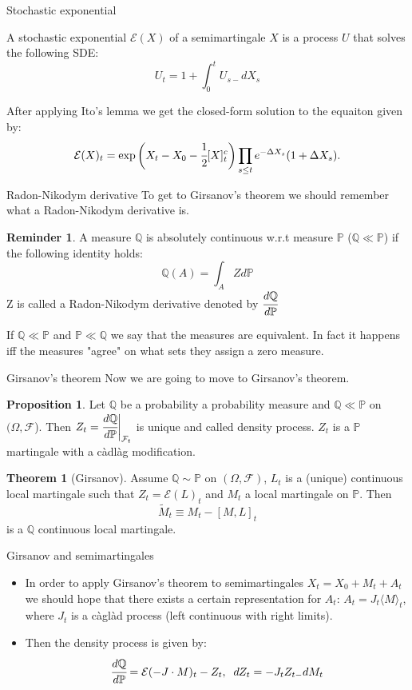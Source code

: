 \documentclass{beamer}%
\theoremstyle{definition}
\newtheorem{mytheor}[theorem]{Theorem}
\newtheorem{reminder}{Reminder}
\newtheorem{proposition}[theorem]{Proposition}
\renewcommand{\P}{\mathbb{P}}
\newcommand{\Q}{\mathbb{Q}}
\begin{document}
\begin{frame}{Stochastic exponential}
\begin{definition}
    A stochastic exponential $\mathcal{E}(X)$  of a semimartingale $X$ is a process $U$ that solves the following SDE:
    $$
    U_t = 1 + \int_0^t U_{s-} dX_s 
    $$
\end{definition}
After applying Ito's lemma we get the closed-form solution to the equaiton given by:
$$
\mathcal{E}(X)_t = 
\exp{\bigg(X_t - X_0 - \cfrac{1}{2} [X]_t^c\bigg)}\prod_{s \leq t} e^{-\Delta X_s}(1 + \Delta X_s).
$$
\end{frame}


\begin{frame}{Radon-Nikodym derivative}
To get to Girsanov's theorem we should remember what a Radon-Nikodym derivative is.
\begin{reminder}
A measure $\mathbb{Q}$ is absolutely continuous w.r.t measure $\P$ ($\mathbb{Q} \ll \P$) if the following identity holds:
$$
\mathbb{Q}(A) = \int_A Z d\mathbb{P}
$$
Z is called a Radon-Nikodym derivative denoted by $\cfrac{d\mathbb{Q}}{d\P}$
\end{reminder}
If $\mathbb{Q} \ll \P$ and $\mathbb{P} \ll \mathbb{Q}$ we say that the measures are equivalent. In fact it happens iff the measures "agree" \; on what sets they assign a zero measure.
\end{frame}

\begin{frame}{Girsanov's theorem}
Now we are going to move to Girsanov's theorem.
\begin{proposition}
Let $\Q$ be a probability a probability measure and  $\Q \ll \P$ on $(\Omega, \mathcal{F}$). Then $Z_t = \cfrac{d\Q}{d\P} \bigg|_{\mathcal{F}_t}$ is unique and called density process. $Z_t$ is a $\P$ martingale with a càdlàg modification.
\end{proposition}

\begin{mytheor}[Girsanov]
Assume $\Q \sim \P$ on $(\Omega, \mathcal{F})$, $L_t$ is a (unique) continuous local martingale such that $Z_t = \mathcal{E}(L)_t$ and $M_t$ a local martingale on $\P$. Then 
$$
\tilde{M}_t \equiv M_t - [M, L]_t
$$
is a $\Q$ continuous local martingale.
\end{mytheor}

    
\end{frame}


\begin{frame}{Girsanov and semimartingales}
\begin{itemize}
    \item In order to apply Girsanov's theorem to semimartingales  $X_t = X_0 + M_t + A_t$ we should hope that there exists a certain representation for $A_t$: $A_t = J_t \langle M \rangle_t$, where $J_t$ is a càglàd process (left continuous with right limits).
    \item Then the density process is given by:
    $$
    \cfrac{d\Q}{d\P} = \mathcal{E}(-J \cdot M)_t - Z_t, \; \; dZ_t = -J_t Z_{t-} dM_t
    $$
\end{itemize}

\end{frame}
\end{document}
